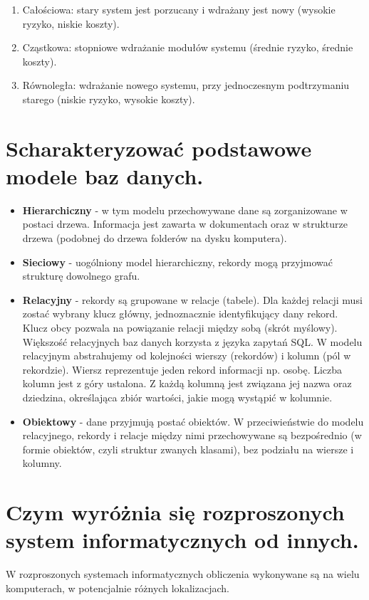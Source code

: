 \documentclass[12pt,a4paper]{article}
\begin{document}
	\begin{enumerate}
		\item Całościowa: stary system jest porzucany i wdrażany jest nowy (wysokie ryzyko, niskie koszty).
		\item Cząstkowa: stopniowe wdrażanie modułów systemu (średnie ryzyko, średnie koszty).
		\item Równoległa: wdrażanie nowego systemu, przy jednoczesnym podtrzymaniu starego (niskie ryzyko, wysokie koszty).	
	\end{enumerate}

	\section{Scharakteryzować podstawowe modele baz danych.}
	\begin{itemize}
		\item  \textbf{Hierarchiczny} - w tym modelu przechowywane dane są zorganizowane w postaci drzewa. Informacja jest zawarta w dokumentach oraz w strukturze drzewa (podobnej do drzewa folderów na dysku komputera).
		\item  \textbf{Sieciowy} - uogólniony model hierarchiczny, rekordy mogą przyjmować strukturę dowolnego grafu.
		\item  \textbf{Relacyjny} - rekordy są grupowane w relacje (tabele). Dla każdej relacji musi zostać wybrany klucz główny, jednoznacznie identyfikujący dany rekord. Klucz obcy pozwala na powiązanie relacji między sobą (skrót myślowy). Większość relacyjnych baz danych korzysta z języka zapytań SQL. W modelu relacyjnym abstrahujemy od kolejności wierszy (rekordów) i kolumn (pól w rekordzie). Wiersz reprezentuje jeden rekord informacji np. osobę. Liczba kolumn jest z góry ustalona. Z każdą kolumną jest związana jej nazwa oraz dziedzina, określająca zbiór wartości, jakie mogą wystąpić w kolumnie.
		\item  \textbf{Obiektowy} - dane przyjmują postać obiektów. W przeciwieństwie do modelu relacyjnego, rekordy i relacje między nimi przechowywane są bezpośrednio (w formie obiektów, czyli struktur zwanych klasami), bez podziału na wiersze i kolumny.
	\end{itemize}

	\section{Czym wyróżnia się rozproszonych system informatycznych od innych.}
	W rozproszonych systemach informatycznych obliczenia wykonywane są na wielu komputerach, w potencjalnie różnych lokalizacjach.
\end{document}

